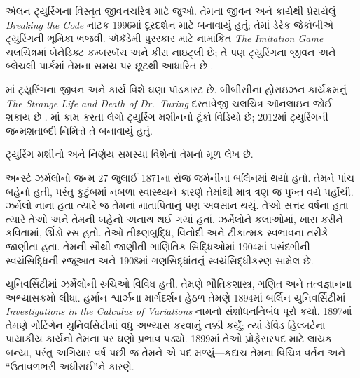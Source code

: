 \begin{reading}
એલન ટ્યુરિંગના
વિસ્તૃત જીવનચરિત્ર
માટે \citet{Hodges2014}
જુઓ. તેમના જીવન
અને કાર્યથી
પ્રેરાયેલું
\emph{Breaking the Code}
નાટક 1996માં
દૂરદર્શન માટે
બનાવાયું હતું;
તેમાં ડેરેક
જેકોબીએ ટ્યુરિંગની
ભૂમિકા ભજવી.
ઍકૅડેમી પુરસ્કાર
માટે નામાંકિત
\emph{The Imitation Game}
ચલચિત્રમાં બેનેડિક્ટ
કમ્બરબૅચ અને
કીરા નાઇટ્લી
છે; તે પણ
ટ્યુરિંગના જીવન
અને બ્લેચલી
પાર્કમાં તેમના
સમય પર છૂટથી
આધારિત છે
\citep{Imitation2014}.

\citet{Radiolab2012}માં
ટ્યુરિંગના જીવન
અને કાર્ય વિશે
ઘણા પૉડકાસ્ટ
છે. બીબીસીના
હોરાઇઝન કાર્યક્રમનું
\emph{The Strange Life and Death of
  Dr.~Turing}
દસ્તાવેજી ચલચિત્ર
ઑનલાઇન જોઈ શકાય
છે \citep{Sykes1992}.
\citep{Theelen2012}માં
કામ કરતા લેગો
ટ્યુરિંગ મશીનનો
ટૂંકો વિડિયો છે;
2012માં ટ્યુરિંગની
જન્મશતાબ્દી નિમિત્તે
તે બનાવાયું હતું.

ટ્યુરિંગ મશીનો
અને નિર્ણય સમસ્યા
વિશેનો તેમનો મૂળ
લેખ \citet{Turing1937}
છે.
\end{reading}
\endgroup


\begingroup
\makeatletter{}\makeatother


\label{guunit:OLP-0632}



અર્ન્સ્ટ ઝર્મેલોનો જન્મ 27 જુલાઈ
1871ના રોજ જર્મનીના બર્લિનમાં
થયો હતો. તેમને પાંચ બહેનો
હતી, પરંતુ કુટુંબમાં નબળા
સ્વાસ્થ્યને કારણે તેમાંથી
માત્ર ત્રણ જ પુખ્ત વયે
પહોંચી. ઝર્મેલો નાના હતા
ત્યારે જ તેમનાં માતાપિતાનું
પણ અવસાન થયું. તેઓ સત્તર
વર્ષના હતા ત્યારે તેઓ અને
તેમની બહેનો અનાથ થઈ
ગયાં હતાં. ઝર્મેલોને કલાઓમાં,
ખાસ કરીને કવિતામાં,
ઊંડો રસ હતો. તેઓ
તીક્ષ્ણબુદ્ધિ, વિનોદી અને
ટીકાત્મક સ્વભાવના
તરીકે જાણીતા હતા.
તેમની સૌથી જાણીતી
ગાણિતિક સિદ્ધિઓમાં
1904માં પસંદગીની
સ્વયંસિદ્ધિની રજૂઆત
અને 1908માં ગણસિદ્ધાંતનું
સ્વયંસિદ્ધીકરણ સામેલ છે.

યુનિવર્સિટીમાં ઝર્મેલોની
રુચિઓ વિવિધ હતી. તેમણે
ભૌતિકશાસ્ત્ર, ગણિત અને
તત્વજ્ઞાનના અભ્યાસક્રમો
લીધા. હર્માન શ્વાર્ઝના
માર્ગદર્શન હેઠળ તેમણે
1894માં બર્લિન
યુનિવર્સિટીમાં
\emph{Investigations in
  the Calculus of Variations}
નામનો સંશોધનનિબંધ
પૂરો કર્યો. 1897માં
તેમણે ગોટિંગેન
યુનિવર્સિટીમાં વધુ
અભ્યાસ કરવાનું નક્કી
કર્યું; ત્યાં ડેવિડ
હિલ્બર્ટના પાયાકીય
કાર્યનો તેમના પર
ઘણો પ્રભાવ પડ્યો.
1899માં તેઓ પ્રોફેસરપદ
માટે લાયક બન્યા,
પરંતુ અગિયાર વર્ષ
પછી જ તેમને એ પદ
મળ્યું—કદાચ તેમના
વિચિત્ર વર્તન અને
“ઉતાવળભરી અધીરાઈ”ને
કારણે.

